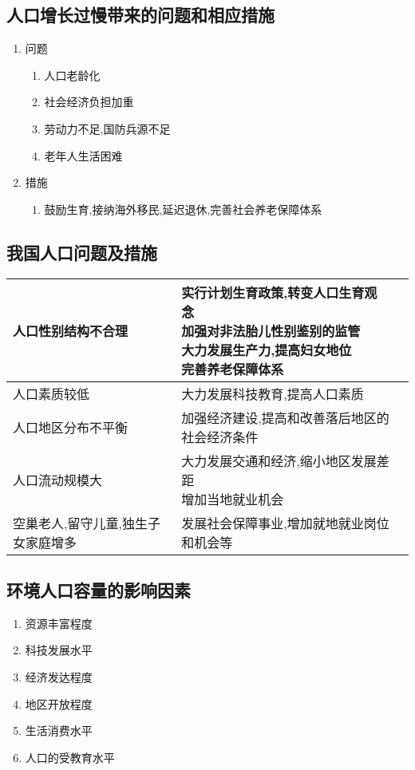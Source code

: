 \documentclass[a4paper]{article}
\begin{document}
    \subsection{人口增长过慢带来的问题和相应措施}
    \begin{enumerate}
        \item 问题
        \begin{enumerate}
            \item 人口老龄化
            \item 社会经济负担加重
            \item 劳动力不足,国防兵源不足
            \item 老年人生活困难
        \end{enumerate}
        \item 措施
        \begin{enumerate}
            \item 鼓励生育,接纳海外移民,延迟退休,完善社会养老保障体系
        \end{enumerate}
    \end{enumerate}
    \subsection{我国人口问题及措施} %
    \begin{table}[h]%
        \begin{tabular}{|p{35mm}|l|l|}
            \hline
            人口性别结构不合理 & \makecell[l]{实行计划生育政策,转变人口生育观念\\加强对非法胎儿性别鉴别的监管\\大力发展生产力,提高妇女地位\\完善养老保障体系} \\
            \hline
            人口素质较低 & 大力发展科技教育,提高人口素质 \\
            \hline
            人口地区分布不平衡 & 加强经济建设,提高和改善落后地区的社会经济条件 \\
            \hline
            人口流动规模大 & \makecell[l]{大力发展交通和经济,缩小地区发展差距 \\ 增加当地就业机会} \\
            \hline
            空巢老人,留守儿童,独生子女家庭增多 & 发展社会保障事业,增加就地就业岗位和机会等 \\
            \hline
        \end{tabular}
    \end{table}
    \subsection{环境人口容量的影响因素}
    \begin{enumerate}
        \item 资源丰富程度
        \item 科技发展水平
        \item 经济发达程度
        \item 地区开放程度
        \item 生活消费水平
        \item 人口的受教育水平
    \end{enumerate}
\end{document}

